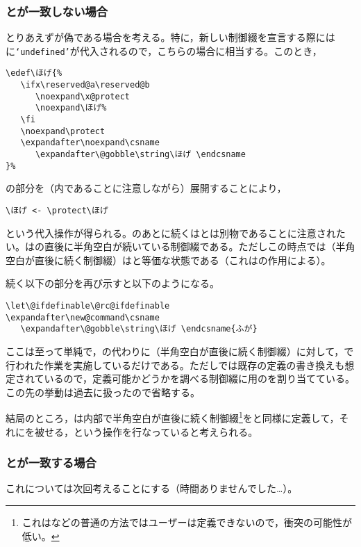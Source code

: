 \documentclass[autodetect-engine,dvipdfmx]{jsarticle}
\begin{document}
\subsubsection{とが一致しない場合}

とりあえずが偽である場合を考える。特に，新しい制御綴を宣言する際にはに\texttt{`undefined'}が代入されるので，こちらの場合に相当する。このとき，
\begin{lstlisting}
\edef\ほげ{%
   \ifx\reserved@a\reserved@b
      \noexpand\x@protect
      \noexpand\ほげ%
   \fi
   \noexpand\protect
   \expandafter\noexpand\csname
      \expandafter\@gobble\string\ほげ \endcsname
}%
\end{lstlisting}
の部分を（内であることに注意しながら）展開することにより，
\begin{lstlisting}
\ほげ <- \protect\ほげ 
\end{lstlisting}
という代入操作が得られる。のあとに続くはとは別物であることに注意されたい。はの直後に半角空白が続いている制御綴である。ただしこの時点では（半角空白が直後に続く制御綴）はと等価な状態である（これはの作用による）。

続く以下の部分を再び示すと以下のようになる。
\begin{lstlisting}
\let\@ifdefinable\@rc@ifdefinable
\expandafter\new@command\csname
   \expandafter\@gobble\string\ほげ \endcsname{ふが}
\end{lstlisting}
ここは至って単純で，の代わりに（半角空白が直後に続く制御綴）に対して，で行われた作業を実施しているだけである。ただしでは既存の定義の書き換えも想定されているので，定義可能かどうかを調べる制御綴に用のを割り当てている。この先の挙動は過去に扱ったので省略する。

結局のところ，は内部で半角空白が直後に続く制御綴\footnote{これはなどの普通の方法ではユーザーは定義できないので，衝突の可能性が低い。}をと同様に定義して，それにを被せる，という操作を行なっていると考えられる。

\subsubsection{とが一致する場合}

これについては次回考えることにする（時間ありませんでした…）。
\end{document}
